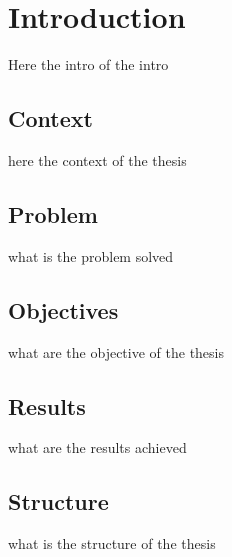 \chapter{Introduction}
Here the intro of the intro
\section{Context}
here the context of the thesis
\section{Problem}
what is the problem solved
\section{Objectives}
what are the objective of the thesis
\section{Results}
what are the results achieved
\section{Structure}
what is the structure of the thesis